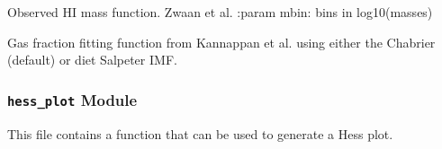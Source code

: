 \documentclass[letterpaper,10pt,english]{sphinxmanual}
\begin{document}

\begin{fulllineitems}
\label{SamPy.astronomy:SamPy.astronomy.gasmasses.HIMassFunctionZwaan}
Observed HI mass function.
Zwaan et al.
:param mbin: bins in log10(masses)

\end{fulllineitems}



\begin{fulllineitems}
\label{SamPy.astronomy:SamPy.astronomy.gasmasses.gasFractionKannappan}
Gas fraction fitting function from Kannappan et al.
using either the Chabrier (default) or diet Salpeter IMF.

\end{fulllineitems}



\subsubsection{\texttt{hess\_plot} Module}
\label{SamPy.astronomy:module-SamPy.astronomy.hess_plot}\label{SamPy.astronomy:hess-plot-module}
This file contains a function that can be used to 
generate a Hess plot.

\end{document}
